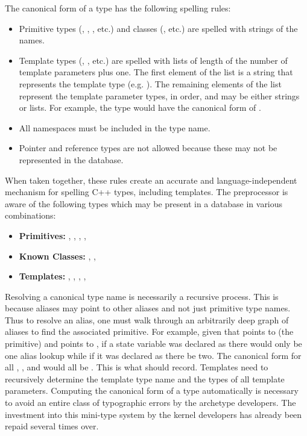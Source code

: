 The canonical form of a type has the following spelling rules:
\begin{itemize}
    \item Primitive types (, , , etc.) 
          and classes (, etc.) are spelled with strings 
          of the names.
    \item Template types (, , etc.) are spelled 
          with lists of length of the number of template parameters plus one.
          The first element of the list is a string that represents the 
          template type (e.g. ). The remaining elements of 
          the list represent the template parameter types, in order, and may 
          be either strings or lists.  For example, the type 
           would have the canonical form 
          of .
    \item All namespaces must be included in the type name.
    \item Pointer and reference types are not allowed because these may not be 
          represented in the database.
\end{itemize}
When taken together, these rules create an accurate and language-independent
mechanism for spelling C++ types, including templates. The preprocessor is aware
of the following types which may be present in a \cyclus database in various 
combinations:
\begin{itemize}
    \item \textbf{Primitives:} , , , , 
    \item \textbf{Known Classes:} , , 
    \item \textbf{Templates:} , , , 
                              , 
\end{itemize}

Resolving a canonical type name is necessarily a recursive process.
This is because aliases may point to other aliases and not just primitive type names.
Thus to resolve an alias, one must walk through an arbitrarily deep graph of aliases 
to find the associated primitive.  For example, given that  points 
to  (the primitive) and  points to , 
if a state variable was declared as  there would only be one 
alias lookup while if it was declared as  there be two. The canonical
form for all , , and  would all be 
.  This is what \cycpp should record.  Templates need to recursively 
determine the template type name and the types of all template parameters.
Computing the canonical form of a type automatically is necessary to avoid an 
entire class of typographic errors by the archetype developers.  The investment
into this mini-type system by the kernel developers has already been repaid several 
times over.


